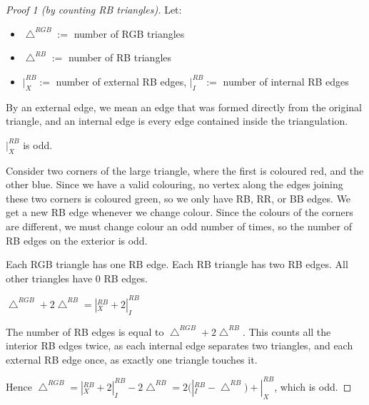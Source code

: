 \begin{proof}[Proof 1 \emph{(by counting RB triangles)}]
	Let:
	\begin{itemize}
		\item $\bigtriangleup^{RGB} :=$ number of RGB triangles
		\item $\bigtriangleup^{RB} :=$ number of RB triangles
		\item $|^{RB}_X :=$ number of external RB edges, $|^{RB}_I :=$
			number of internal RB edges
	\end{itemize}

	By an external edge, we mean an edge that was formed directly from the
	original triangle, and an internal edge is every edge contained inside the
	triangulation.

	\begin{claim*}
		$|^{RB}_X$ is odd.
	\end{claim*}
	\begin{subproof}
		Consider two corners of the large triangle, where the first is coloured
		red, and the other blue. Since we have a valid colouring, no vertex
		along the edges joining these two corners is coloured green, so we only
		have RB, RR, or BB edges. We get a new RB edge whenever we change
		colour. Since the colours of the corners are different, we must change
		colour an odd number of times, so the number of RB edges on the
		exterior is odd.
	\end{subproof}

	\begin{claim*}
		Each RGB triangle has one RB edge. Each RB triangle has two RB edges.
		All other triangles have 0 RB edges.
	\end{claim*}

	\begin{claim*}
		$\bigtriangleup^{RGB} + 2\bigtriangleup^{RB} = |^{RB}_X +
		2|^{RB}_I$
	\end{claim*}
	\begin{subproof}
		The number of RB edges is equal to
		$\bigtriangleup^{RGB}+2\bigtriangleup^{RB}$. This counts all the
		interior RB edges twice, as each internal edge separates two triangles,
		and each external RB edge once, as exactly one triangle touches it.
	\end{subproof}

	Hence $\bigtriangleup^{RGB} = |^{RB}_X + 2|^{RB}_I - 2\bigtriangleup^{RB} =
	2(|^{RB}_I - \bigtriangleup^{RB}) + |^{RB}_X$, which is odd.

\end{proof}


